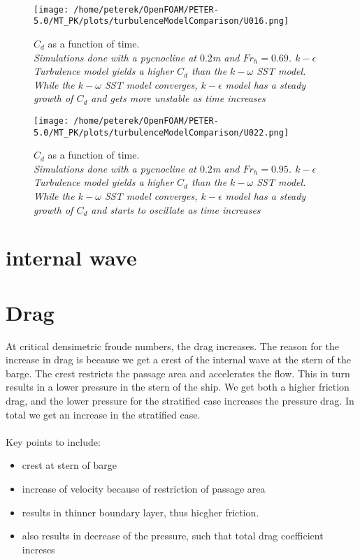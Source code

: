 \documentclass[a4paper, 12pt]{report}
\begin{document}
\\
\begin{minipage}[t]{.45\textwidth}
	\begin{figure}[H]
		\centering
		\texttt{[image: /home/peterek/OpenFOAM/PETER-5.0/MT\_PK/plots/turbulenceModelComparison/U016.png]}
		\caption{$C_d$ as a function of time.\\ \textit{Simulations done with a pycnocline at $0.2$m and $Fr_h=0.69$. $k-\epsilon$ Turbulence model yields a higher $C_d$ than the $k-\omega$ SST model. While the $k-\omega$ SST model converges, $k-\epsilon$ model has a steady growth of $C_d$ and gets more unstable as time increases}}
		\label{fig:turbulenceModelComparison1}
	\end{figure}
\end{minipage}\hfill
\vspace{2ex}
\begin{minipage}[t]{.45\textwidth} 
	\begin{figure}[H]
		\centering
		\texttt{[image: /home/peterek/OpenFOAM/PETER-5.0/MT\_PK/plots/turbulenceModelComparison/U022.png]}
		\caption{$C_d$ as a function of time.  \\ \textit{Simulations done with a pycnocline at $0.2$m and $Fr_h=0.95$. $k-\epsilon$ Turbulence model yields a higher $C_d$ than the $k-\omega$ SST model. While the $k-\omega$ SST model converges, $k-\epsilon$ model has a steady growth of $C_d$ and starts to oscillate as time increases}}
		\label{fig:turbulenceModelComparison2}
	\end{figure}
\end{minipage}\hfill

\section{internal wave}

\section{Drag}
At critical densimetric froude numbers, the drag increases. The reason for the increase in drag is because we get a crest of the internal wave at the stern of the barge. The crest restricts the passage area and accelerates the flow. This in turn results in a lower pressure in the stern of the ship. We get both a higher friction drag, and the lower pressure for the stratified case increases the pressure drag. In total we get an increase in the stratified case.\\
\\ 
Key points to include:
\begin{itemize}
	\item crest at stern of barge
	\item increase of velocity because of restriction of passage area
	\item results in thinner boundary layer, thus hicgher friction.
	\item also results in decrease of the pressure, such that total drag coefficient increses
\end{itemize}
\end{document}
